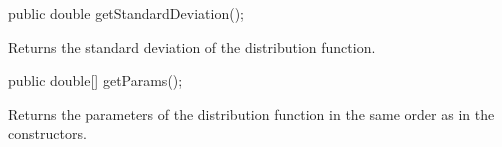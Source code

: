 \begin{code}

   public double getStandardDeviation();
\end{code}
\begin{tabb}   Returns the standard deviation of the distribution function.
\end{tabb}
\begin{code}

   public double[] getParams();
\end{code}
\begin{tabb}  Returns the parameters of the distribution function in the same
 order as in the constructors.
\end{tabb}
\begin{code}\begin{hide}
}\end{hide}
\end{code}
